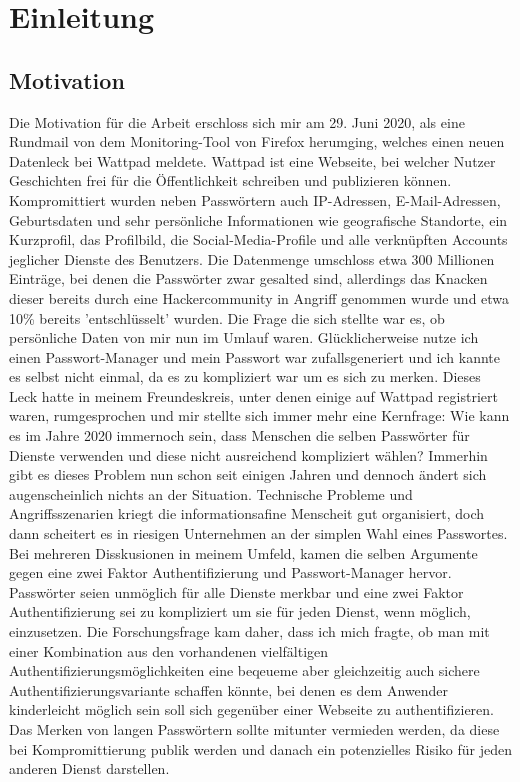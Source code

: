 \chapter{Einleitung}

\section{Motivation}
Die Motivation für die Arbeit erschloss sich mir am 29. Juni 2020, als eine Rundmail von dem Monitoring-Tool von Firefox herumging, welches einen neuen Datenleck bei Wattpad meldete. Wattpad ist eine Webseite, bei welcher Nutzer Geschichten frei für die Öffentlichkeit schreiben und publizieren können. Kompromittiert wurden neben Passwörtern auch IP-Adressen, E-Mail-Adressen, Geburtsdaten und sehr persönliche Informationen wie geografische Standorte, ein Kurzprofil, das Profilbild, die Social-Media-Profile und alle verknüpften Accounts jeglicher Dienste des Benutzers. Die Datenmenge umschloss etwa 300 Millionen Einträge, bei denen die Passwörter zwar gesalted sind, allerdings das Knacken dieser bereits durch eine Hackercommunity in Angriff genommen wurde und etwa 10\% bereits 'entschlüsselt' wurden. Die Frage die sich stellte war es, ob persönliche Daten von mir nun im Umlauf waren. Glücklicherweise nutze ich einen Passwort-Manager und mein Passwort war zufallsgeneriert und ich kannte es selbst nicht einmal, da es zu kompliziert war um es sich zu merken. Dieses Leck hatte in meinem Freundeskreis, unter denen einige auf Wattpad registriert waren, rumgesprochen und mir stellte sich immer mehr eine Kernfrage: Wie kann es im Jahre 2020 immernoch sein, dass Menschen die selben Passwörter für Dienste verwenden und diese nicht ausreichend kompliziert wählen? Immerhin gibt es dieses Problem nun schon seit einigen Jahren und dennoch ändert sich augenscheinlich nichts an der Situation. Technische Probleme und Angriffsszenarien kriegt die informationsafine Menscheit gut organisiert, doch dann scheitert es in riesigen Unternehmen an der simplen Wahl eines Passwortes. Bei mehreren Disskusionen in meinem Umfeld, kamen die selben Argumente gegen eine zwei Faktor Authentifizierung und Passwort-Manager hervor. Passwörter seien unmöglich für alle Dienste merkbar und eine zwei Faktor Authentifizierung sei zu kompliziert um sie für jeden Dienst, wenn möglich, einzusetzen. Die Forschungsfrage kam daher, dass ich mich fragte, ob man mit einer Kombination aus den vorhandenen vielfältigen Authentifizierungsmöglichkeiten eine beqeueme aber gleichzeitig auch sichere Authentifizierungsvariante schaffen könnte, bei denen es dem Anwender kinderleicht möglich sein soll sich gegenüber einer Webseite zu authentifizieren. Das Merken von langen Passwörtern sollte mitunter vermieden werden, da diese bei Kompromittierung publik werden und danach ein potenzielles Risiko für jeden anderen Dienst darstellen.

